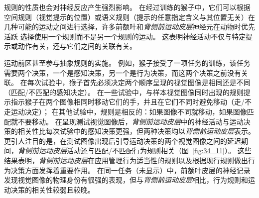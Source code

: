 规则的性质也会对神经反应产生强烈影响。
在经过训练的猴子中，它们可以根据空间规则（视觉提示的位置）或语义规则（提示的任意指定含义与其位置无关）在几种可能的运动之间进行选择，许多前额叶和\textit{背侧前运动皮层}神经元在动物时优先活跃 选择使用一个规则而不是另一个规则的运动。
这表明神经活动不仅与特定提示或动作有关，还与它们之间的关联有关。


运动前区甚至参与抽象规则的实施。
例如，猴子接受了一项任务的训练，该任务需要两个决策，一个是感知决策，另一个是行为决策，而这两个决策之前没有关联。
在每次试验中，猴子首先必须决定两个顺序呈现的视觉图像是相同还是不同（匹配/不匹配的感知决定）。
在一些试验中，与样本视觉图像同时出现的规则提示指示猴子在两个图像相同时移动它们的手，并且在它们不同时避免移动（走/不走运动决定）；
在其他试验中，规则是相反的：如果图像不同就移动，如果图像匹配就不要移动。
在呈现测试视觉图像后，\textit{背侧前运动皮层}中的神经活动与运动决策的相关性比每次试验中的感知决策更强，但两种决策均以\textit{背侧前运动皮层}表示。
更引人注目的是，在测试图像出现后引导运动决策的两个视觉图像之间的延迟期间，\textit{背侧前运动皮层}活动还与匹配/不匹配行为规则相关（图~\ref{fig:34_11}）。
这些结果表明，\textit{背侧前运动皮层}在应用管理行为适当性的规则以及根据现行规则做出行为决策方面发挥着重要作用。
在同一任务（未显示）中，前额叶皮层的神经记录发现视觉图像的物理身份有很强的表现，但与\textit{背侧前运动皮层}相比，行为规则和运动决策的相关性较弱且较晚。


